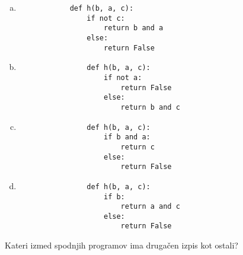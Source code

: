 \documentclass[arhiv, 10pt]{../izpit}
\begin{document}
        \begin{multicols}{2}
        \begin{enumerate}[(a)]
\item 
            \begin{verbatim}
            def h(b, a, c):
                if not c:
                    return b and a
                else:
                    return False
            \end{verbatim}
        
\item 
                \begin{verbatim}
                def h(b, a, c):
                    if not a:
                        return False
                    else:
                        return b and c
                \end{verbatim}
            
\item 
                \begin{verbatim}
                def h(b, a, c):
                    if b and a:
                        return c
                    else:
                        return False
                \end{verbatim}
            
\item 
                \begin{verbatim}
                def h(b, a, c):
                    if b:
                        return a and c
                    else:
                        return False
                \end{verbatim}
            
\end{enumerate}

        \end{multicols}
    
        \naloga*
        
        Kateri izmed spodnjih programov ima drugačen izpis kot ostali?
    
\end{document}
